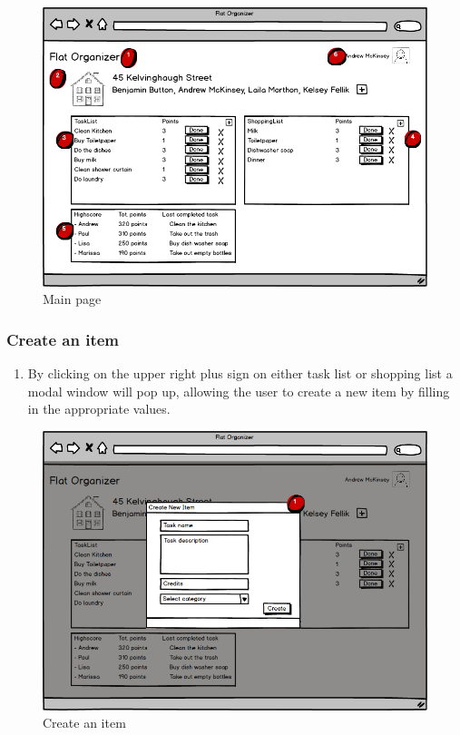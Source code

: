 \documentclass{sig-alt-release2}
\begin{document}
\begin{figure}[!ht]
\centering
\includegraphics[scale=0.22]{Flat}
\caption{Main page}
\label{fig:mainpage}
\end{figure}	

\subsubsection{Create an item}
	
\begin{enumerate}
\item By clicking on the upper right plus sign on either task list or shopping list a modal window will pop up, allowing the user to create a new item by filling in the appropriate values.
\end{enumerate}

\begin{figure}[!ht]
\centering
\includegraphics[scale=0.25]{createItem}
\caption{Create an item}
\label{fig:createitem}
\end{figure}
\end{document}
